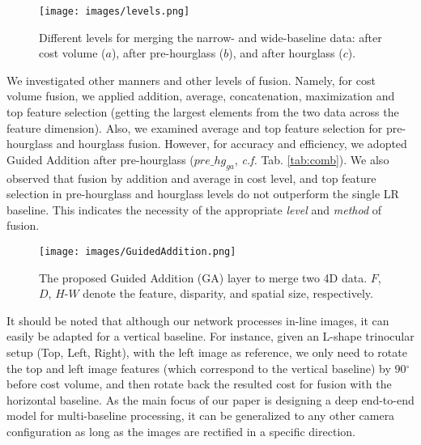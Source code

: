 \documentclass[10pt,twocolumn,letterpaper]{article}
\begin{document}
\begin{figure}[t]
	\begin{center}
		\texttt{[image: images/levels.png]}
	\end{center}
	\vspace{-0.7cm}
	\caption{Different levels for merging the narrow- and wide-baseline data: after cost volume ($a$), after pre-hourglass ($b$), and after hourglass ($c$).}
	\label{fig:levels}
\end{figure} 
We investigated other manners and other levels of fusion. Namely, for cost volume fusion, we applied addition, average, concatenation, maximization and top feature selection (\ie getting the largest elements from the two data across the feature dimension). Also, we examined average and top feature selection for pre-hourglass and hourglass fusion. However, for accuracy and efficiency, we adopted Guided Addition after pre-hourglass (${pre\_hg_{ga}}$, \emph{c.f.} Tab. \ref{tab:comb}). We also observed that fusion by addition and average in cost level, and top feature selection in pre-hourglass and hourglass levels do not outperform the single LR baseline. This indicates the necessity of the appropriate \emph{level} and \emph{method} of fusion.
\begin{figure}[t]
	\begin{center}
		\texttt{[image: images/GuidedAddition.png]}
	\end{center}
	\vspace{-0.7cm}
	\caption{The proposed Guided Addition (GA) layer to merge two 4D data. $F$, $D$, $H$-$W$ denote the feature, disparity, and spatial size, respectively.}
	\label{fig:ga}
\end{figure} 
It should be noted that although our network processes in-line images, it can easily be adapted for a vertical baseline. For instance, given an L-shape trinocular setup (Top, Left, Right), with the left image as reference, we only need to rotate the top and left image features (which correspond to the vertical baseline) by 90$^{\circ}$ before cost volume, and then rotate back the resulted cost for fusion with the horizontal baseline. As the main focus of our paper is designing a deep end-to-end model for multi-baseline processing, it can be generalized to any other camera configuration as long as the images are rectified in a specific direction.
\vspace{-0.1cm}
\end{document}
